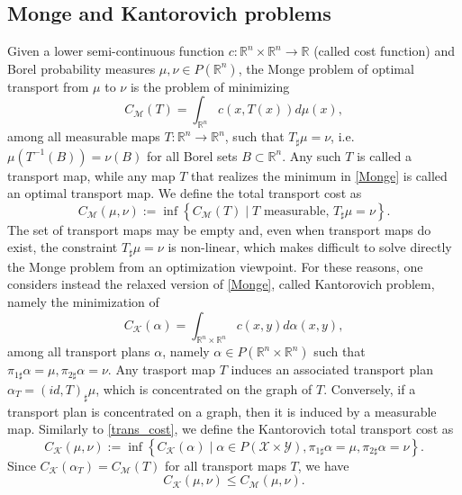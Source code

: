 \documentclass[reqno]{amsart}
\theoremstyle{plain}
\theoremstyle{definition}
\theoremstyle{remark}
\newcommand{\R}{\mathbb{R}}
\begin{document}
\subsection{Monge and Kantorovich problems}
Given a lower semi-continuous function $c:\R^n \times \R^n \to\mathbb{R}$ (called cost function) and Borel probability measures $\mu,\nu\in P(\R^n)$, the Monge problem of optimal transport from $\mu$ to $\nu$ is the problem of minimizing
\begin{equation}\label{Monge}
	C_{\mathcal{M}}(T)=\int_{\R^n}c(x,T(x))d\mu(x),
\end{equation}
among all measurable maps $T:\mathbb{R}^n\to \mathbb{R}^n$, such that $T_{\sharp}\mu=\nu$, i.e.\ $\mu(T^{-1}(B))=\nu(B)$ for all Borel sets $B\subset \R^n$. Any such $T$ is called a transport map, while any map $T$ that realizes the minimum in \eqref{Monge} is called an optimal transport map.
We define the total transport cost as  
\begin{equation}\label{trans_cost}
	C_{\mathcal{M}}(\mu,\nu):=\inf \left\{C_{\mathcal{M}}(T)\mid T \text{ measurable, } T_{\sharp}\mu=\nu\right\}.
\end{equation}
The set of transport maps may be empty and, even when transport maps do exist, the constraint $T_{\sharp}\mu=\nu$ is non-linear, which makes difficult to solve directly the Monge problem from an optimization viewpoint. For these reasons, one considers instead  the relaxed version of  \eqref{Monge}, called Kantorovich problem, namely the minimization of
	\begin{equation}\label{Kantorovich}
		C_{\mathcal{K}}(\alpha)=\int_{\R^n \times \R^n}c(x,y)d\alpha(x,y),
	\end{equation} 
	among all transport plans $\alpha$, namely $\alpha \in P(\R^n \times \R^n)$ such that $\pi_{1\sharp}\alpha=\mu,\pi_{2\sharp}\alpha=\nu$.
	Any trasport map $T$ induces an associated transport plan $\alpha_T=(id,T)_{\sharp}\mu$, which is concentrated on the graph of $T$. Conversely, if a transport plan is concentrated on a graph, then it is induced by a measurable map.
	Similarly to \eqref{trans_cost}, we define the Kantorovich total transport cost as 
	\begin{equation}
		C_{\mathcal{K}}(\mu,\nu):=\inf \left\{C_{\mathcal{K}}(\alpha)\mid \alpha\in P(\mathcal{X}\times \mathcal{Y}),\pi_{1\sharp}\alpha=\mu,\pi_{2\sharp}\alpha=\nu\right\}.
	\end{equation}
	Since $C_{\mathcal{K}}(\alpha_T)=C_{\mathcal{M}}(T)$ for all transport maps $T$, we have
	\begin{equation}
		C_{\mathcal{K}}(\mu,\nu)\leq C_{\mathcal{M}}(\mu,\nu).
	\end{equation}
\end{document}
